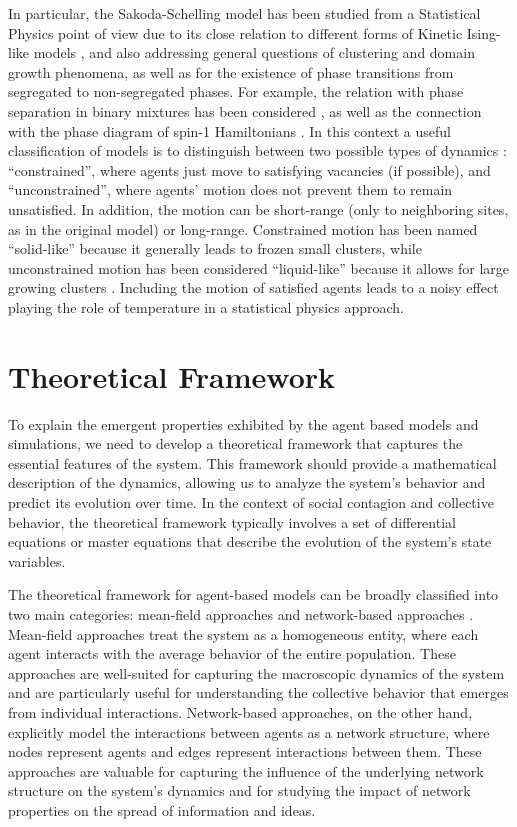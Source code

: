 In particular, the Sakoda-Schelling model has been studied from a Statistical Physics point of view due to its close relation to different forms of Kinetic Ising-like models \cite{stauffer-2007,stauffer-2013}, and also addressing general questions of clustering and domain growth phenomena, as well as for the existence of phase transitions from segregated to non-segregated phases. For example, the relation with phase separation in binary mixtures has been considered \cite{Dall_Asta_2008,Vinkovic}, as well as the connection with the phase diagram of spin-1 Hamiltonians \cite{BEG,BlumeCapel,Gauvin_2009,Gauvin_2010}. In this context a useful classification of models is to distinguish between two possible types of dynamics \cite{Dall_Asta_2008}: ``constrained'', where agents just move to satisfying vacancies (if possible), and ``unconstrained'',  where agents' motion does not prevent them to remain unsatisfied. In addition, the motion can be short-range (only to neighboring sites, as in the original model) or long-range. Constrained motion has been named ``solid-like'' because it generally leads to frozen small clusters, while unconstrained motion has been considered ``liquid-like'' because it allows for large growing clusters \cite{Vinkovic}. Including the motion of satisfied agents leads to a noisy effect playing the role of temperature in a statistical physics approach. 

\section{\label{sec:Theoretical Framework} Theoretical Framework}

To explain the emergent properties exhibited by the agent based models and simulations, we need to develop a theoretical framework that captures the essential features of the system. This framework should provide a mathematical description of the dynamics, allowing us to analyze the system's behavior and predict its evolution over time. In the context of social contagion and collective behavior, the theoretical framework typically involves a set of differential equations or master equations that describe the evolution of the system's state variables.

The theoretical framework for agent-based models can be broadly classified into two main categories: mean-field approaches and network-based approaches \cite{barrat-2008}. Mean-field approaches treat the system as a homogeneous entity, where each agent interacts with the average behavior of the entire population. These approaches are well-suited for capturing the macroscopic dynamics of the system and are particularly useful for understanding the collective behavior that emerges from individual interactions. Network-based approaches, on the other hand, explicitly model the interactions between agents as a network structure, where nodes represent agents and edges represent interactions between them. These approaches are valuable for capturing the influence of the underlying network structure on the system's dynamics and for studying the impact of network properties on the spread of information and ideas.

